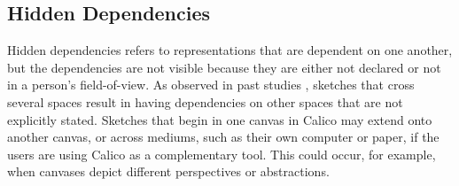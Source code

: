 

%

\subsection{Hidden Dependencies}


Hidden dependencies refers to representations that are dependent on one another, but the dependencies are not visible because they are either not declared or not in a person's field-of-view. As observed in past studies \cite{dekel2007notation}, sketches that cross several spaces result in having dependencies on other spaces that are not explicitly stated. Sketches that begin in one canvas in Calico may extend onto another canvas, or across mediums, such as their own computer or paper, if the users are using Calico as a complementary tool. This could occur, for example, when canvases depict different perspectives or abstractions. 

